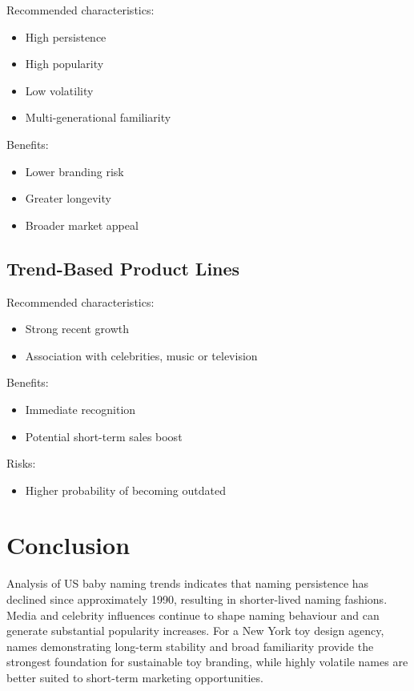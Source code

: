 \documentclass[11pt,preprint]{elsarticle}
\numberwithin{equation}{section}
\numberwithin{figure}{section}
\numberwithin{table}{section}
\def\tightlist{} %
\begin{document}
Recommended characteristics:

\begin{itemize}
\tightlist
\item
  High persistence
\item
  High popularity
\item
  Low volatility
\item
  Multi-generational familiarity
\end{itemize}

Benefits:

\begin{itemize}
\tightlist
\item
  Lower branding risk
\item
  Greater longevity
\item
  Broader market appeal
\end{itemize}

\subsection{Trend-Based Product Lines}\label{trend-based-product-lines}

Recommended characteristics:

\begin{itemize}
\tightlist
\item
  Strong recent growth
\item
  Association with celebrities, music or television
\end{itemize}

Benefits:

\begin{itemize}
\tightlist
\item
  Immediate recognition
\item
  Potential short-term sales boost
\end{itemize}

Risks:

\begin{itemize}
\tightlist
\item
  Higher probability of becoming outdated
\end{itemize}

\section{Conclusion}\label{conclusion}

Analysis of US baby naming trends indicates that naming persistence has
declined since approximately 1990, resulting in shorter-lived naming
fashions. Media and celebrity influences continue to shape naming
behaviour and can generate substantial popularity increases. For a New
York toy design agency, names demonstrating long-term stability and
broad familiarity provide the strongest foundation for sustainable toy
branding, while highly volatile names are better suited to short-term
marketing opportunities.


\end{document}
